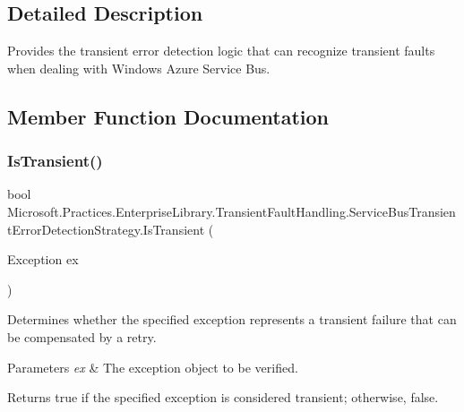 \subsection{Detailed Description}
Provides the transient error detection logic that can recognize transient faults when dealing with Windows Azure Service Bus. 



\subsection{Member Function Documentation}
\mbox{\label{classMicrosoft_1_1Practices_1_1EnterpriseLibrary_1_1TransientFaultHandling_1_1ServiceBusTransientErrorDetectionStrategy_a1d5de793d531ec7ca5a5eccad3e00b60_a1d5de793d531ec7ca5a5eccad3e00b60}} 
\subsubsection{\texorpdfstring{Is\+Transient()}{IsTransient()}}
{\footnotesize\ttfamily bool Microsoft.\+Practices.\+Enterprise\+Library.\+Transient\+Fault\+Handling.\+Service\+Bus\+Transient\+Error\+Detection\+Strategy.\+Is\+Transient (\begin{DoxyParamCaption}\item[{Exception}]{ex }\end{DoxyParamCaption})}



Determines whether the specified exception represents a transient failure that can be compensated by a retry. 


\begin{DoxyParams}{Parameters}
{\em ex} & The exception object to be verified.\\
\hline
\end{DoxyParams}
\begin{DoxyReturn}{Returns}
true if the specified exception is considered transient; otherwise, false.
\end{DoxyReturn}
